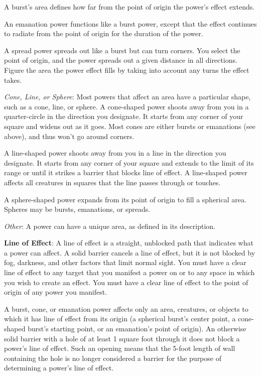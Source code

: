 A burst's area defines how far from the point of origin the power's effect extends.

An emanation power functions like a burst power, except that the effect continues to radiate from the point of origin for the duration of the power.

A spread power spreads out like a burst but can turn corners. You select the point of origin, and the power spreads out a given distance in all directions. Figure the area the power effect fills by taking into account any turns the effect takes.

\textit{Cone, Line, or Sphere}: Most powers that affect an area have a particular shape, such as a cone, line, or sphere. A cone-shaped power shoots away from you in a quarter-circle in the direction you designate. It starts from any corner of your square and widens out as it goes. Most cones are either bursts or emanations (see above), and thus won't go around corners.

A line-shaped power shoots away from you in a line in the direction you designate. It starts from any corner of your square and extends to the limit of its range or until it strikes a barrier that blocks line of effect. A line-shaped power affects all creatures in squares that the line passes through or touches.

A sphere-shaped power expands from its point of origin to fill a spherical area. Spheres may be bursts, emanations, or spreads.

\textit{Other}: A power can have a unique area, as defined in its description.

\textbf{Line of Effect}: A line of effect is a straight, unblocked path that indicates what a power can affect. A solid barrier cancels a line of effect, but it is not blocked by fog, darkness, and other factors that limit normal sight. You must have a clear line of effect to any target that you manifest a power on or to any space in which you wish to create an effect. You must have a clear line of effect to the point of origin of any power you manifest.

A burst, cone, or emanation power affects only an area, creatures, or objects to which it has line of effect from its origin (a spherical burst's center point, a cone-shaped burst's starting point, or an emanation's point of origin). An otherwise solid barrier with a hole of at least 1 square foot through it does not block a power's line of effect. Such an opening means that the 5-foot length of wall containing the hole is no longer considered a barrier for the purpose of determining a power's line of effect.